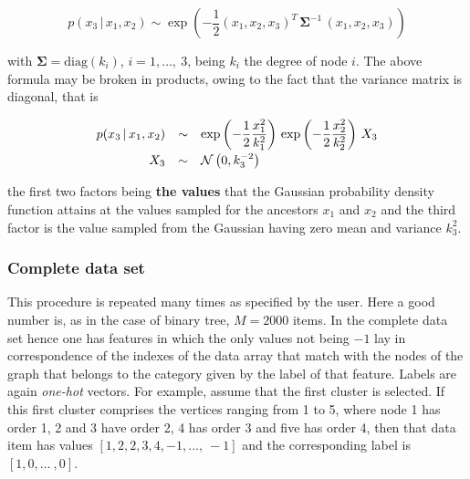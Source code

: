 \documentclass[a4paper,12pt]{article}
\begin{document}
\begin{equation}
	\displaystyle p(x_3 \, | \, x_1, x_2) \sim \exp \left( - \frac{1}{2} (x_1, x_2, x_3)^T \, \bm{\Sigma}^{-1} \, (x_1, x_2, x_3) \right)
\end{equation}

with $\bm{\Sigma} = \text{diag}(k_i)$, $i = 1, \dots, \ 3$, being $k_i$ the degree of node $i$. The above formula may be broken in products, owing to the fact that the variance matrix is diagonal, that is 

\begin{equation}
	\begin{array}{r c l}
		\displaystyle p(x_3 \, | \, x_1, x_2) &\sim& \exp \left(-\dfrac{1}{2} \dfrac{x_1^2}{k_1^2}\right) \, \exp \left(-\dfrac{1}{2} \dfrac{x_2^2}{k_2^2}\right) \, X_3 \\[3mm] %
		X_3 &\sim& \mathcal{N}\left( 0, k_3^{-2} \right)
	\end{array}
\end{equation}

the first two factors being \textbf{the values} that the Gaussian probability density function attains at the values sampled for the ancestors $x_1$ and $x_2$ and the third factor is the value sampled from the Gaussian having zero mean and variance $k_3^2$.

\subsubsection{Complete data set}

This procedure is repeated many times as specified by the user. Here a good number is, as in the case of binary tree, $M = 2000$ items. In the complete data set hence one has features in which the only values not being $-1$ lay in correspondence of the indexes of the data array that match with the nodes of the graph that belongs to the category given by the label of that feature. Labels are again \textit{one-hot} vectors. For example, assume that the first cluster is selected. If this first cluster comprises the vertices ranging from 1 to 5, where node 1 has order 1, 2 and 3 have order 2, 4 has order 3 and five has order 4, then that data item has values $[1, 2, 2, 3, 4, -1, \dots, \ -1]$ and the corresponding label is $[1, 0, \dots\ , 0]$.
\end{document}

